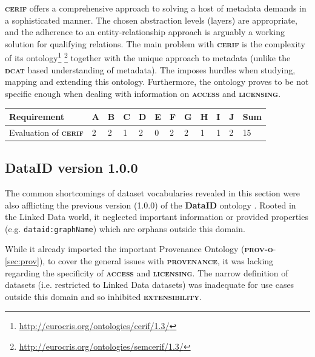\documentclass[a4paper,english,twoside,BCOR1.5cm,headsepline,DIV12,appendixprefix,final,12pt]{scrbook}
\newcommand{\provenance}{{\ttfamily\scshape\bfseries provenance}\xspace}
\newcommand{\licensing}{{\ttfamily\scshape\bfseries licensing}\xspace}
\newcommand{\access}{{\ttfamily\scshape\bfseries access}\xspace}
\newcommand{\extensibility}{{\ttfamily\scshape\bfseries extensibility}\xspace}
\newcommand{\dataid}{{\ttfamily\bfseries DataID}\xspace}
\newcommand{\prov}{{\scshape\bfseries prov-o}\xspace}
\newcommand{\dcat}{{\scshape\bfseries dcat}\xspace}
\newcommand{\cerif}{{\scshape\bfseries cerif}\xspace}
\newcommand{\prop}[1]{{{\texttt{#1}}}}
\newcommand\footnoteurl[1]{\footnote{\scriptsize\url{#1}}}
\begin{document}
\cerif offers a comprehensive approach to solving a host of metadata demands in a sophisticated manner. 
The chosen abstraction levels (layers) are appropriate, and the adherence to an entity-relationship approach is arguably a working solution for qualifying relations. The main problem with \cerif is the complexity of its ontology\footnoteurl{http://eurocris.org/ontologies/cerif/1.3/} \footnoteurl{http://eurocris.org/ontologies/semcerif/1.3/} together with the unique approach to metadata (unlike the \dcat based understanding of metadata). The imposes hurdles when studying, mapping and extending this ontology. 
Furthermore, the ontology proves to be not specific enough when dealing with information on \access and \licensing.

\begin{table}[!htbp]
    \centering
    \begin{tabular}{|l|l|l|l|l|l|l|l|l|l|l|l|}
        \hline
        Requirement & A & B & C & D & E & F & G & H & I & J & Sum \\
        \hline
        Evaluation of \cerif & 2 & 2 & 1 & 2 & 0 & 2 & 2 & 1 & 1 & 2 & 15 \\
        \hline
    \end{tabular}
    \label{tab:evaldcatap}
\end{table}


\subsection{DataID version 1.0.0}
\label{sec:dataid100}

The common shortcomings of dataset vocabularies revealed in this section were also afflicting the previous version (1.0.0) of the \dataid ontology \cite{dataID2014}. Rooted in the Linked Data world, it neglected important information or provided properties (e.g. \prop{dataid:graphName}) which are orphans outside this domain. 

While it already imported the important Provenance Ontology (\prov  - \cref{sec:prov}), to cover the general issues with \provenance, it was lacking regarding the specificity of \access and \licensing. The narrow definition of datasets (i.e. restricted to Linked Data datasets) was inadequate for use cases outside this domain and so inhibited \extensibility.
\end{document}
